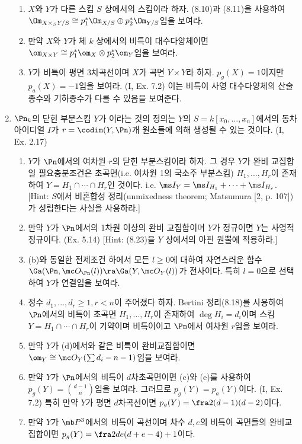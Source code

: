 \begin{enumerate}[label=\tb{8.\arabic*.},itemindent=0mm,itemsep=2mm]
\begin{enumerate}[label=(\alph*)]
	\item $X$와 $Y$가 다른 스킴 $S$ 상에서의 스킴이라 하자.
	(8.10)과 (8.11)을 사용하여 $\Om_{X\times_SY/S}\cong p_1^*\Om_{X/S}\oplus p_2^*\Om_{Y/S}$임을 보여라.
	\item 만약 $X$와 $Y$가 체 $k$ 상에서의 비특이 대수다양체이면 $\om_{X\times Y}\cong p_1^*\om_X\otimes p_2^*\om_Y$임을 보여라.
	\item $Y$가 비특이 평면 3차곡선이며 $X$가 곡면 $Y\times Y$라 하자. $p_g(X)=1$이지만 $p_a(X)=-1$임을 보여라. (I, Ex. 7.2)
	이는 비특이 사영 대수다양체의 산술종수와 기하종수가 다를 수 있음을 보여준다.
	\end{enumerate}
	\item {} $\Pn_k$의 닫힌 부분스킴 $Y$가
	이라는 것의 정의는 
	$Y$의 $S=k[x_0,\ldots,x_n]$에서의 동차 아이디얼 $I$가 $r=\codim(Y,\Pn)$개 원소들에 의해 생성될 수 있는 것이다. (I, Ex. 2.17)
	\begin{enumerate}[label=(\alph*)]
	\item $Y$가 $\Pn$에서의 여차원 $r$의 닫힌 부분스킴이라 하자.
	그 경우 $Y$가 완비 교집합일 필요충분조건은 초곡면(i.e. 여차원 1의 국소주 부분스킴) $H_1,\ldots,H_r$이 존재하여
	 $Y=H_1\cap\cdots\cap H_r$인 것이다. i.e. $\ms I_Y=\ms I_{H_1}+\cdots+\ms I_{H_r}$.
	[Hint: $S$에서 비혼합성 정리(unmixedness theorem; Matsumura [2, p. 107])가 성립한다는 사실을 사용하라.]
	\item 만약 $Y$가 $\Pn$에서의 1차원 이상의 완비 교집합이며 $Y$가 정규이면 $Y$는 사영적 정규이다. (Ex. 5.14)
	[Hint: (8.23)을 $Y$ 상에서의 아핀 원뿔에 적용하라.]
	\item (b)와 동일한 전제조건 하에서 모든 $l\ge 0$에 대하여 자연스러운 함수 $\Ga(\Pn,\mc O_{\Pn}(l))\ra\Ga(Y,\mc O_Y(l))$가 전사이다.
	특히 $l=0$으로 선택하여 $Y$가 연결임을 보여라.
	\item 정수 $d_1,\ldots,d_r\ge 1,r<n$이 주어졌다 하자. Bertini 정리(8.18)를 사용하여
	$\Pn$에서의 비특이 초곡면 $H_1,\ldots,H_r$이 존재하여 $\deg H_i=d_i$이며
	스킴 $Y=H_1\cap\cdots\cap H_r$이 기약이며 비특이이고 $\Pn$에서 여차원 $r$임을 보여라.
	\item 만약 $Y$가 (d)에서와 같은 비특이 완비교집합이면 $\om_Y\cong\mc O_Y(\sum d_i-n-1)$임을 보여라.
	\item 만약 $Y$가 $\Pn$에서의 비특이 $d$차초곡면이면 (c)와 (e)를 사용하여 $p_g(Y)=\binom{d-1}n$임을 보여라.
	그러므로 $p_g(Y)=p_a(Y)$이다. (I, Ex. 7.2)
	특히 만약 $Y$가 평면 $d$차곡선이면 $p_g(Y)=\fra 2(d-1)(d-2)$이다.
	\item 만약 $Y$가 $\mb P^3$에서의 비특이 곡선이며 차수 $d,e$의 비특이 곡면들의 완비교집합이면 $p_g(Y)=\fra 2de(d+e-4)+1$이다.

\end{enumerate}
\end{enumerate}
